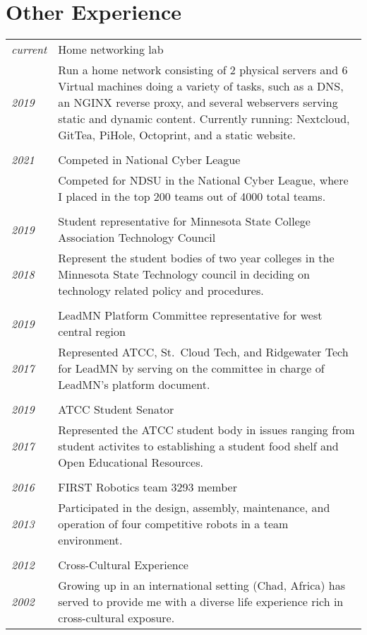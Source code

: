 \documentclass[letterpaper,10pt]{article}
\begin{document}
\section*{Other Experience}
	\begin{tabular}{R{2cm}|p{14cm}}
	\textsl{current} & Home networking lab\\
	\textsl{2019} & Run a home network consisting of 2 physical servers and 6 Virtual machines doing a variety of tasks, such as a DNS, an NGINX reverse proxy, and several webservers serving static and dynamic content. Currently running: Nextcloud, GitTea, PiHole, Octoprint, and a static website.\\
	\\
	\textsl{2021} & Competed in National Cyber League\\
	& Competed for NDSU in the National Cyber League, where I placed in the top 200 teams out of 4000 total teams.\\
	\\
	\textsl{2019} & Student representative for Minnesota State College Association Technology Council\\
	\textsl{2018} & Represent the student bodies of two year colleges in the Minnesota State Technology council in deciding on technology related policy and procedures.\\
	\\
	\textsl{2019} & LeadMN Platform Committee representative for west central region\\
	\textsl{2017} & Represented ATCC, St.\ Cloud Tech, and Ridgewater Tech for LeadMN by serving on the committee in charge of LeadMN's platform document.\\
	\\
	\textsl{2019} & ATCC Student Senator\\
	\textsl{2017} & Represented the ATCC student body in issues ranging from student activites to establishing a student food shelf and Open Educational Resources.\\
	\\
	\textsl{2016} & FIRST Robotics team 3293 member\\
	\textsl{2013} & Participated in the design, assembly, maintenance, and operation of four competitive robots in a team environment.\\
	\\
	\textsl{2012} & Cross-Cultural Experience\\
	\textsl{2002} &Growing up in an international setting (Chad, Africa) has served to provide me with a diverse life experience rich in cross-cultural exposure.\\
	\end{tabular}
\end{document}
